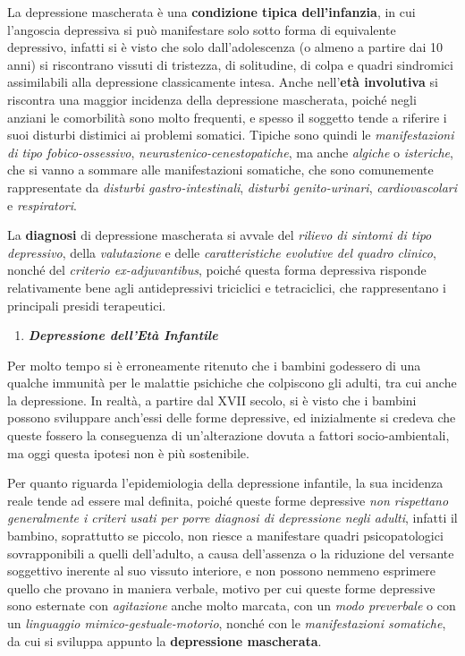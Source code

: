 \documentclass[]{article}
\begin{document}
La depressione mascherata è una \textbf{condizione tipica
dell'infanzia}, in cui l'angoscia depressiva si può manifestare solo
sotto forma di equivalente depressivo, infatti si è visto che solo
dall'adolescenza (o almeno a partire dai 10 anni) si riscontrano vissuti
di tristezza, di solitudine, di colpa e quadri sindromici assimilabili
alla depressione classicamente intesa. Anche nell'\textbf{età
involutiva} si riscontra una maggior incidenza della depressione
mascherata, poiché negli anziani le comorbilità sono molto frequenti, e
spesso il soggetto tende a riferire i suoi disturbi distimici ai
problemi somatici. Tipiche sono quindi le \emph{manifestazioni di tipo
fobico-ossessivo}, \emph{neurastenico-cenestopatiche}, ma anche
\emph{algiche} o \emph{isteriche}, che si vanno a sommare alle
manifestazioni somatiche, che sono comunemente rappresentate da
\emph{disturbi gastro-intestinali}, \emph{disturbi genito-urinari},
\emph{cardiovascolari} e \emph{respiratori}.

La \textbf{diagnosi} di depressione mascherata si avvale del
\emph{rilievo di sintomi di tipo depressivo}, della \emph{valutazione} e
delle \emph{caratteristiche evolutive del quadro clinico}, nonché del
\emph{criterio ex-adjuvantibus}, poiché questa forma depressiva risponde
relativamente bene agli antidepressivi triciclici e tetraciclici, che
rappresentano i principali presidi terapeutici.

\begin{enumerate}
\def\labelenumi{\arabic{enumi}.}
\item
  \textbf{\emph{Depressione dell'Età Infantile}}
\end{enumerate}

Per molto tempo si è erroneamente ritenuto che i bambini godessero di
una qualche immunità per le malattie psichiche che colpiscono gli
adulti, tra cui anche la depressione. In realtà, a partire dal XVII
secolo, si è visto che i bambini possono sviluppare anch'essi delle
forme depressive, ed inizialmente si credeva che queste fossero la
conseguenza di un'alterazione dovuta a fattori socio-ambientali, ma oggi
questa ipotesi non è più sostenibile.

Per quanto riguarda l'epidemiologia della depressione infantile, la sua
incidenza reale tende ad essere mal definita, poiché queste forme
depressive \emph{non rispettano generalmente i criteri usati per porre
diagnosi di depressione negli adulti}, infatti il bambino, soprattutto
se piccolo, non riesce a manifestare quadri psicopatologici
sovrapponibili a quelli dell'adulto, a causa dell'assenza o la riduzione
del versante soggettivo inerente al suo vissuto interiore, e non possono
nemmeno esprimere quello che provano in maniera verbale, motivo per cui
queste forme depressive sono esternate con \emph{agitazione} anche molto
marcata, con un \emph{modo preverbale} o con un \emph{linguaggio
mimico-gestuale-motorio}, nonché con le \emph{manifestazioni somatiche},
da cui si sviluppa appunto la \textbf{depressione mascherata}.
\end{document}
